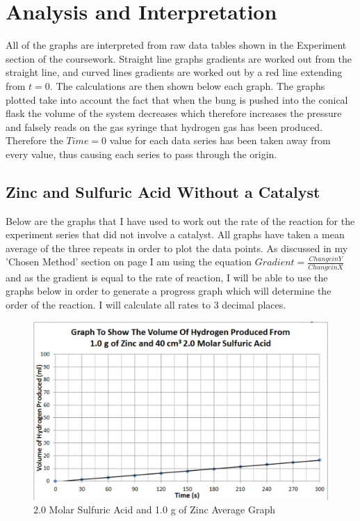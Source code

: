 \chapter {Analysis and Interpretation} 



All of the graphs are interpreted from raw data tables shown in the Experiment section of the coursework. Straight line graphs gradients are worked out from the straight line, and curved lines gradients are worked out by a red line extending from $t = 0$. The calculations are then shown below each graph. The graphs plotted take into account the fact that when the bung is pushed into the conical flask the volume of the system decreases which therefore increases the pressure and falsely reads on the gas syringe that hydrogen gas has been produced. Therefore the $Time = 0$ value for each data series has been taken away from every value, thus causing each series to pass through the origin.

\section{Zinc and Sulfuric Acid Without a Catalyst} %

Below are the graphs that I have used to work out the rate of the reaction for the experiment series that did not involve a catalyst. All graphs have taken a mean average of the three repeats in order to plot the data points. As discussed in my 'Chosen Method' section on page \pageref{Chosen Method} I am using the equation $Gradient = \frac{Change in Y}{Change in X}$ and as the gradient is equal to the rate of reaction, I will be able to use the graphs below in order to generate a progress graph which will determine the order of the reaction. I will calculate all rates to 3 decimal places.

\begin{figure}[H]
    \includegraphics[width=\textwidth]{./Analysis/Images/1NonCatalyst/2Molar.pdf}
    \caption{2.0 Molar Sulfuric Acid and 1.0 g of Zinc Average Graph} \label{fig:2MolarSAGradient}
\end{figure}

